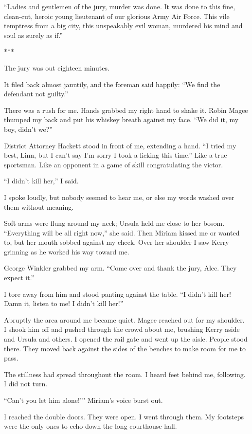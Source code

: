 \documentclass{novel}
\begin{document}
“Ladies and gentlemen of the jury, murder was done. It was done to this fine, clean-cut, heroic young lieutenant of our glorious Army Air Force. This vile temptress from a big city, this unspeakably evil woman, murdered his mind and soul as surely as if.”

***

The jury was out eighteen minutes.

It filed back almost jauntily, and the foreman said happily: “We find the defendant not guilty.”

There was a rush for me. Hands grabbed my right hand to shake it. Robin Magee thumped my back and put his whiskey breath against my face. “We did it, my boy, didn’t we?”

District Attorney Hackett stood in front of me, extending a hand. “I tried my best, Linn, but I can’t say I’m sorry I took a licking this time.” Like a true sportsman. Like an opponent in a game of skill congratulating the victor.

“I didn’t kill her,” I said.

I spoke loudly, but nobody seemed to hear me, or else my words washed over them without meaning.

Soft arms were flung around my neck; Ursula held me close to her bosom. “Everything will be all right now,” she said. Then Miriam kissed me or wanted to, but her mouth sobbed against my cheek. Over her shoulder I saw Kerry grinning as he worked his way toward me.

George Winkler grabbed my arm. “Come over and thank the jury, Alec. They expect it.”

I tore away from him and stood panting against the table. “I didn’t kill her! Damn it, listen to me! I didn’t kill her!”

Abruptly the area around me became quiet. Magee reached out for my shoulder. I shook him off and pushed through the crowd about me, brushing Kerry aside and Ursula and others. I opened the rail gate and went up the aisle. People stood there. They moved back against the sides of the benches to make room for me to pass.

The stillness had spread throughout the room. I heard feet behind me, following. I did not turn.

“Can’t you let him alone!”’ Miriam’s voice burst out.

I reached the double doors. They were open. I went through them. My footsteps were the only ones to echo down the long courthouse hall.
\end{document}
